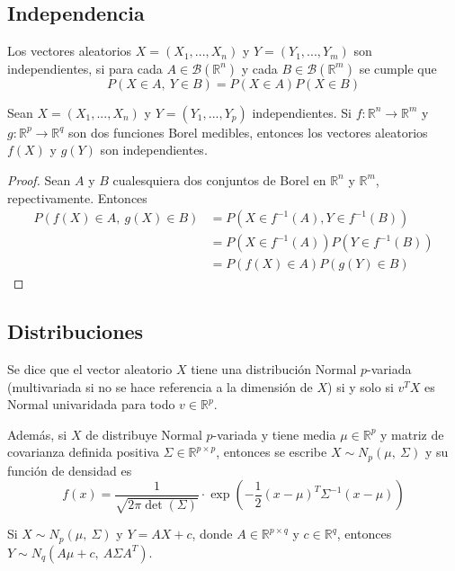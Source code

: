 \subsection{Independencia}

\begin{definition}
    Los vectores aleatorios $X=(X_1,...,X_n)$ y $Y=(Y_1,...,Y_m)$
    son independientes, si para cada $A\in \mathcal B(\mathbb R^n)$
    y cada $B\in \mathcal B(\mathbb R^m)$ se cumple que
    $$P(X\in A,\ Y\in B)=P(X\in A)P(X\in B)$$
\end{definition}

\begin{proposition}\label{prop:fun_vect_indep}
    Sean $X=(X_1,...,X_n)$ y $Y=(Y_1,...,Y_p)$ independientes. Si 
    $f:\mathbb R^n \to \mathbb R^m$ y $g:\mathbb R^p \to \mathbb R^q$
    son dos funciones Borel medibles, entonces los vectores
    aleatorios $f(X)$ y $g(Y)$ son independientes.
\end{proposition}

\begin{proof}
    Sean $A$ y $B$ cualesquiera dos conjuntos de Borel en $\mathbb R^n$
    y $\mathbb R^m$, repectivamente. Entonces
    \begin{align*}
        P(f(X)\in A,\ g(X)\in B)&= P(X\in f^{-1}(A),Y\in f^{-1}(B))\\
        &=  P(X\in f^{-1}(A))P(Y\in f^{-1}(B))\\
        &=  P(f(X)\in A)P(g(Y)\in B)
    \end{align*}
\end{proof}

\subsection{Distribuciones}

\begin{definition}
    Se dice que el vector aleatorio $X$ tiene una distribución
    Normal $p$-variada (multivariada si no se hace referencia 
    a la dimensión de $X$) si y solo si $v^TX$ es Normal univaridada
    para todo $v\in \mathbb R^p$.
\end{definition}

Además, si $X$ de distribuye Normal $p$-variada y tiene media 
$\mu\in \mathbb R^p$ y matriz de covarianza definida positiva
$\Sigma \in \mathbb R^{p\times p}$, entonces se escribe
$X\sim N_p(\mu,\ \Sigma)$ y su función de densidad es 
\begin{equation*}
    f(x) = \frac{1}{\sqrt{2\pi\det(\Sigma)}}\cdot 
    \exp\left(
        -\frac{1}{2}(x-\mu)^T \Sigma^{-1} (x-\mu)
    \right)
\end{equation*}

\begin{theorem}
Si $X\sim N_p(\mu,\ \Sigma)$ y $Y=AX+c$, donde 
$A\in \mathbb R^{p\times q}$ y $c\in \mathbb R^q$, 
entonces $Y\sim N_q(A\mu + c,\ A\Sigma A^T)$.
\end{theorem}